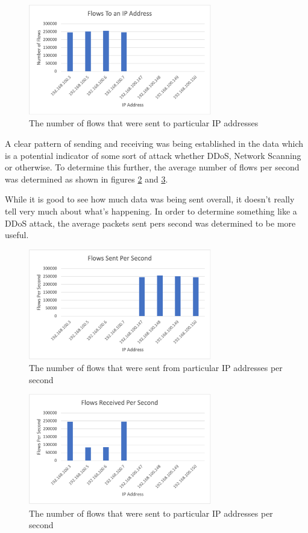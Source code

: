 \documentclass[conference]{IEEEtran}
\begin{document}
\begin{figure}[htbp]
    \includegraphics[width=8cm]{Figure2.png}
    \centering
    \caption{The number of flows that were sent to particular IP addresses}
    \label{fig:flowto}
\end{figure}

A clear pattern of sending and receiving was being established in the data which is a potential indicator of some
sort of attack whether DDoS, Network Scanning or otherwise. To determine this further, the average number of flows
per second was determined as shown in figures \ref{fig:sentfrompersec} and \ref{fig:senttopersec}.

While it is good to see how much data was being sent overall, it doesn't really tell very much about what's happening.
In order to determine something like a DDoS attack, the average packets sent pers second was determined to be more useful.

\begin{figure}[htbp]
    \includegraphics[width=8cm]{Figure3.png}
    \centering
    \caption{The number of flows that were sent from particular IP addresses per second}
    \label{fig:sentfrompersec}
\end{figure}

\begin{figure}[htbp]
    \includegraphics[width=8cm]{Figure4.png}
    \centering
    \caption{The number of flows that were sent to particular IP addresses per second}
    \label{fig:senttopersec}
\end{figure}
\end{document}

